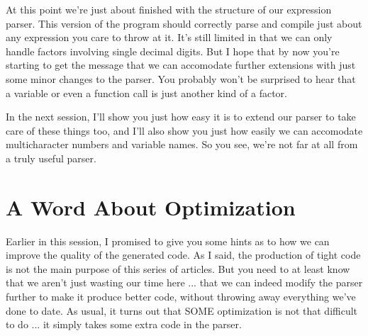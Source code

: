 \documentclass[float=false, crop=false]{standalone}
\begin{document}
At this point we're just about finished with the structure of our expression
parser. This version of the program should correctly parse and compile just
about any expression you care to throw at it. It's still limited in that we can
only handle factors involving single decimal digits. But I hope that by now
you're starting to get the message that we can accomodate further extensions
with just some minor changes to the parser. You probably won't be surprised to
hear that a variable or even a function call is just another kind of a factor.

In the next session, I'll show you just how easy it is to extend our parser to
take care of these things too, and I'll also show you just how easily we can
accomodate multicharacter numbers and variable names. So you see, we're not far
at all from a truly useful parser.

\section{A Word About Optimization}

Earlier in this session, I promised to give you some hints as to how we can
improve the quality of the generated code. As I said, the production of tight
code is not the main purpose of this series of articles. But you need to at
least know that we aren't just wasting our time here ... that we can indeed
modify the parser further to make it produce better code, without throwing away
everything we've done to date. As usual, it turns out that SOME optimization is
not that difficult to do ... it simply takes some extra code in the parser.
\end{document}
